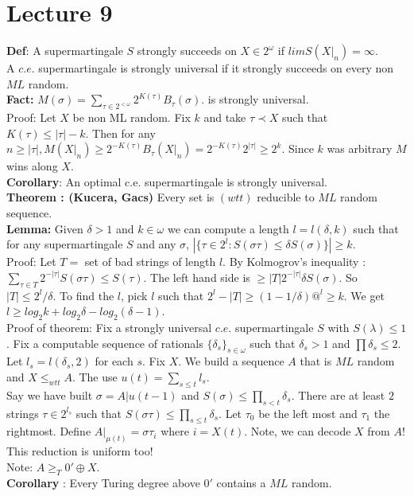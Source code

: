 \documentclass{article}
\begin{document}
     \section{Lecture 9}
     \textbf{Def}: A supermartingale $S$ strongly succeeds on $X\in 2^\omega$ if $lim S(X|_n) = \infty$. \\
     A $c.e.$ supermartingale is strongly universal if it strongly succeeds on every non $ML$ random.\\
     \textbf{Fact:} $M(\sigma) = \sum_{\tau \in 2^{<\omega}} 2^{K(\tau)} B_\tau(\sigma)$. is strongly universal.\\
     Proof: Let $X$ be non ML random. Fix $k$ and take $\tau \prec X$ such that $K(\tau)\leq |\tau| - k$. Then for any $n\geq |\tau|, M(X|_n) \geq 2^{-K(\tau)} B_\tau(X|_n) = 2^{-K(\tau)} 2^{|\tau|} \geq 2^k $. Since $k$ was arbitrary $M$ wins along $X$.\\
     \textbf{Corollary}: An optimal c.e. supermartingale is strongly universal.
     \\
     \textbf{Theorem : (Kucera, Gacs)} Every set is $(wtt)$ reducible to $ML$ random sequence.\\
     \textbf{Lemma:} Given $\delta > 1$ and $k\in \omega$ we can compute a length $l= l(\delta,k)$ such that for any supermartingale $S$ and any $\sigma$, $|\{\tau \in 2^l: S(\sigma \tau) \leq \delta S(\sigma)\}| \geq k$.\\
     Proof: Let $T = $ set of bad strings of length $l$. By Kolmogrov's inequality : $\sum_{\tau \in T} 2^{-|\tau|}S(\sigma \tau) \leq S(\tau)$. The left hand side is $\geq |T| 2^{-|\tau|}\delta S(\sigma)$. So $|T| \leq 2^l/\delta$. To find the $l$, pick $l$ such that $2^l - |T| \geq (1-1/\delta)@^l \geq k$. We get $l \geq log_2 k + log_2 \delta - log_2(\delta -1)$.\\
     Proof of theorem: Fix a strongly universal $c.e.$ supermartingale $S$ with $S(\lambda) \leq 1$. Fix a computable sequence of rationals $\{\delta_s\}_{s \in \omega}$ such that $\delta_s > 1$ and $\prod \delta_s \leq 2$.\\
     Let $l_s = l(\delta_s , 2)$ for each $s$. Fix $X$. We build a sequence $A$ that is $ML$ random and $X \leq_{wtt} A$. The use $u(t) = \sum_{s\leq t} l_s$.\\
     Say we have built $\sigma = A|u(t-1)$ and $S(\sigma) \leq \prod_{s<t} \delta_s$. There are at least $2$ strings $\tau \in 2^{l_s}$ such that $S(\sigma \tau) \leq \prod_{s\leq t} \delta_s$. Let $\tau_0$ be the left most and $\tau_1$ the rightmost. Define $A|_{\mu(t)} = \sigma \tau_i$ where $i  = X(t)$. Note, we can decode $X$ from $A$! This reduction is uniform too!\\
     Note: $A\geq_T 0' \oplus X$.\\
     \textbf{Corollary} : Every Turing degree above $0'$ contains a $ML$ random.\\
\end{document}
